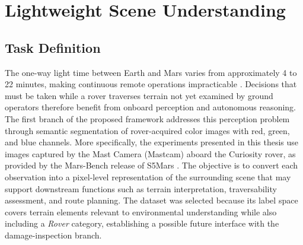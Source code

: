 \chapter{Lightweight Scene Understanding}

\section{Task Definition}

The one-way light time between Earth and Mars varies from approximately 4 to 22 minutes, making continuous remote operations impracticable \cite{nasaJPL2022Driving}. Decisions that must be taken while a rover traverses terrain not yet examined by ground operators therefore benefit from onboard perception and autonomous reasoning. The first branch of the proposed framework addresses this perception problem through semantic segmentation of rover-acquired color images with red, green, and blue channels. More specifically, the experiments presented in this thesis use images captured by the Mast Camera (Mastcam) aboard the Curiosity rover, as provided by the Mars-Bench release of S5Mars \cite{zhang2024s5mars,purohit2025marsbench}. The objective is to convert each observation into a pixel-level representation of the surrounding scene that may support downstream functions such as terrain interpretation, traversability assessment, and route planning.
The dataset was selected because its label space covers terrain elements relevant to environmental understanding while also including a \emph{Rover} category, establishing a possible future interface with the damage-inspection branch.

